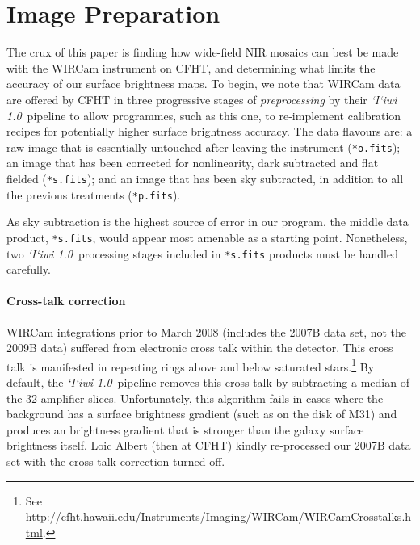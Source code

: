 \documentclass[iop]{emulateapj}
\newcommand{\sw}[1]{\textit{#1}} %
\newcommand{\iiwione}{\sw{`I`iwi 1.0}}
\begin{document}
\section{Image Preparation}
\label{sec:reduction}

The crux of this paper is finding how wide-field NIR mosaics can best be made with the WIRCam instrument on CFHT, and determining what limits the accuracy of our surface brightness maps.
To begin, we note that WIRCam data are offered by CFHT in three progressive stages of \emph{preprocessing} by their \iiwione\ pipeline to allow programmes, such as this one, to re-implement calibration recipes for potentially higher surface brightness accuracy.
The data flavours are: a raw image that is essentially untouched after leaving the instrument (\texttt{*o.fits}); an image that has been corrected for nonlinearity, dark subtracted and flat fielded (\texttt{*s.fits}); and an image that has been sky subtracted, in addition to all the previous treatments (\texttt{*p.fits}).

As sky subtraction is the highest source of error in our program, the middle data product, \texttt{*s.fits}, would appear most amenable as a starting point.
Nonetheless, two \iiwione\ processing stages included in \texttt{*s.fits} products must be handled carefully.

\paragraph{Cross-talk correction} WIRCam integrations prior to March 2008 (includes the 2007B data set, not the 2009B data) suffered from electronic cross talk within the detector.
This cross talk is manifested in repeating rings above and below saturated stars.\footnote{See \url{http://cfht.hawaii.edu/Instruments/Imaging/WIRCam/WIRCamCrosstalks.html}.}
By default, the \iiwione\ pipeline removes this cross talk by subtracting a median of the 32 amplifier slices.
Unfortunately, this algorithm fails in cases where the background has a surface brightness gradient (such as on the disk of M31) and produces an brightness gradient that is stronger than the galaxy surface brightness itself.
Loic Albert (then at CFHT) kindly re-processed our 2007B data set with the cross-talk correction turned off.
\end{document}
